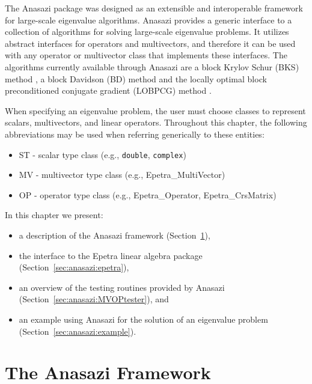 \begin{introchapter}
The Anasazi package was designed as an extensible and interoperable framework
for large-scale eigenvalue algorithms. Anasazi provides a generic interface to a
collection of algorithms for solving large-scale eigenvalue problems. It
utilizes abstract interfaces for operators and multivectors, and therefore it
can be used with any operator or multivector class that implements these
interfaces. The algorithms currently available through Anasazi are a block
Krylov Schur (BKS) method \cite{Stewart2001}, a block Davidson (BD) method and
the locally optimal block preconditioned conjugate gradient (LOBPCG) method
\cite{Knyazev2001}.

When specifying an eigenvalue problem, the user must choose classes to represent
scalars, multivectors, and linear operators. Throughout this chapter, the
following abbreviations may be used when referring generically to these
entities:
\begin{itemize}
\item ST - scalar type class (e.g., \verb!double!, \verb!complex!)
\item MV - multivector type class (e.g., Epetra\_MultiVector)
\item OP - operator type class (e.g., Epetra\_Operator, Epetra\_CrsMatrix)
\end{itemize}

In this chapter we present:
\begin{itemize}
\item a description of the Anasazi framework (Section~\ref{sec:anasazi:framework}),
\item the interface to the Epetra linear algebra package
(Section~\ref{sec:anasazi:epetra}), 
\item an overview of the testing routines provided by Anasazi
(Section~\ref{sec:anasazi:MVOPtester}), and
\item an example using Anasazi for the solution of an eigenvalue problem 
(Section~\ref{sec:anasazi:example}).
\end{itemize}
\end{introchapter}

\section{The Anasazi Framework}
\label{sec:anasazi:framework}

